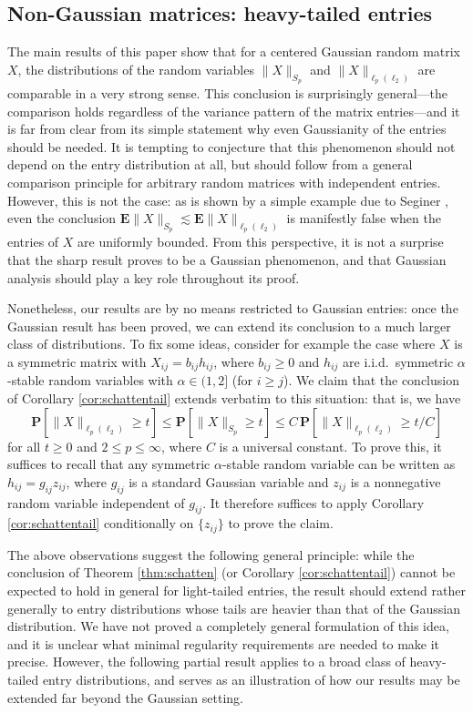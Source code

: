 \documentclass[10pt,reqno]{amsart}
\theoremstyle{definition}
\numberwithin{equation}{section}
\numberwithin{figure}{section}
\numberwithin{table}{section}
\begin{document}
\subsection{Non-Gaussian matrices: heavy-tailed entries}
\label{sec:nong}

The main results of this paper show that for a centered Gaussian random 
matrix $X$, the distributions of the random variables $\|X\|_{S_p}$ and 
$\|X\|_{\ell_p(\ell_2)}$ are comparable in a very strong sense. This 
conclusion is surprisingly general---the comparison holds regardless of 
the variance pattern of the matrix entries---and it is far from clear from 
its simple statement why even Gaussianity of the entries should be needed. 
It is tempting to conjecture that this phenomenon should not depend on the 
entry distribution at all, but should follow from a general comparison 
principle for arbitrary random matrices with independent entries. However, 
this is not the case: as is shown by a simple example due to Seginer 
\cite[Theorem 3.2]{Seg00}, even the conclusion 
$\mathbf{E}\|X\|_{S_p}\lesssim \mathbf{E}\|X\|_{\ell_p(\ell_2)}$ is 
manifestly false when the entries of $X$ are uniformly bounded. From this 
perspective, it is not a surprise that the sharp result proves to be a 
Gaussian phenomenon, and that Gaussian analysis should play a key role 
throughout its proof.

Nonetheless, our results are by no means restricted to Gaussian entries: 
once the Gaussian result has been proved, we can extend its conclusion to 
a much larger class of distributions. To fix some ideas, consider for 
example the case where $X$ is a symmetric matrix with 
$X_{ij}=b_{ij}h_{ij}$, where $b_{ij}\ge 0$ and $h_{ij}$ are i.i.d.\ 
symmetric $\alpha$-stable random variables with $\alpha\in(1,2]$ (for
$i\ge j$). We claim 
that the conclusion of Corollary \ref{cor:schattentail} extends verbatim 
to this situation: that is, we have
$$
	\mathbf{P}[\|X\|_{\ell_p(\ell_2)}\ge t] \le
	\mathbf{P}[\|X\|_{S_p}\ge t] \le
	C\,\mathbf{P}[\|X\|_{\ell_p(\ell_2)}\ge t/C]
$$
for all $t\ge 0$ and $2\le p\le\infty$, where $C$ is a universal constant.
To prove this, it suffices to recall \cite[p.\ 176]{Fel71}
that any symmetric $\alpha$-stable random variable can be written as
$h_{ij}=g_{ij}z_{ij}$, where $g_{ij}$ is a standard Gaussian variable and 
$z_{ij}$ is a nonnegative random variable independent of $g_{ij}$. It 
therefore suffices to apply Corollary \ref{cor:schattentail} conditionally 
on $\{z_{ij}\}$ to prove the claim.

The above observations suggest the following general principle: while the 
conclusion of Theorem \ref{thm:schatten} (or Corollary 
\ref{cor:schattentail}) cannot be expected to hold in general for 
light-tailed entries, the result should extend rather generally to entry 
distributions whose tails are heavier than that of the Gaussian 
distribution. We have not proved a completely general formulation of this 
idea, and it is unclear what minimal regularity requirements are needed to 
make it precise. However, the following partial result applies to a broad 
class of heavy-tailed entry distributions, and serves as an illustration 
of how our results may be extended far beyond the Gaussian setting.
\end{document}
